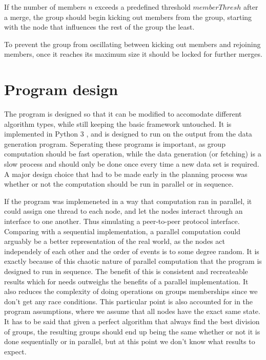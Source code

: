 If the number of members $n$ exceeds a predefined threshold $memberThresh$ after a merge, the group should begin kicking out members from the group, starting with the node
that influences the rest of the group the least. 

To prevent the group from oscillating between kicking out members and rejoining members, once it reaches
its maximum size it should be locked for further merges. 

\section{Program design}
The program is designed so that it can be modified to accomodate different algorithm types, while still keeping the basic framework untouched.
It is implemented in Python 3 \cite{Python3}, and is designed to run on the output from the data generation program. Seperating these programs is important,
as group computation should be fast operation, while the data generation (or fetching) is a slow process and should only be done once every time a new data set is required. 
A major design choice that had to be made early in the planning process  was whether or not the computation should be run in parallel or in sequence. 

If the program was implemeneted in a way that computation ran in parallel, it could assign one thread to each node, and let the nodes interact through an interface to one another. Thus simulating a
peer-to-peer protocol interface. Comparing with a sequential implementation, a parallel computation could arguably be a better representation of the real world,
as the nodes act independely of each other and the order of events is to some degree random.
It is exactly because of this chaotic nature of parallel computation that the program is designed to run in sequence.
The benefit of this is consistent and recreateable results which for needs outweighs the benefits of a parallel implementation. It also reduces the complexity of doing operations
on groups memberships since we don't get any race conditions. This particular point is also accounted for in the program assumptions, where we assume that all nodes have the exact same state.
It has to be said that given a perfect algorithm that always find the best division of groups, the resulting groups should end up being the same whether or not it is done sequentially or in 
parallel, but at this point we don't know what results to expect. 



